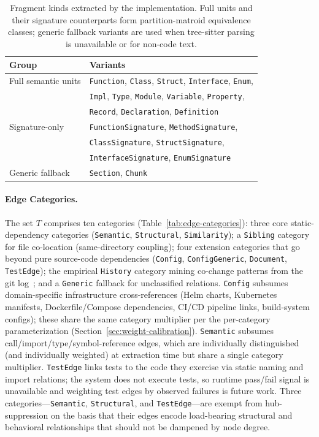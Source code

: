 \documentclass[11pt, a4paper]{article}
\begin{document}
\begin{table}[h]
\centering
\small
\begin{tabular}{ll}
\toprule
\textbf{Group} & \textbf{Variants} \\
\midrule
Full semantic units & \texttt{Function}, \texttt{Class}, \texttt{Struct}, \texttt{Interface}, \texttt{Enum}, \\
                    & \texttt{Impl}, \texttt{Type}, \texttt{Module}, \texttt{Variable}, \texttt{Property}, \\
                    & \texttt{Record}, \texttt{Declaration}, \texttt{Definition} \\
Signature-only      & \texttt{FunctionSignature}, \texttt{MethodSignature}, \\
                    & \texttt{ClassSignature}, \texttt{StructSignature}, \\
                    & \texttt{InterfaceSignature}, \texttt{EnumSignature} \\
Generic fallback    & \texttt{Section}, \texttt{Chunk} \\
\bottomrule
\end{tabular}
\caption{Fragment kinds extracted by the implementation. Full units and their signature counterparts form partition-matroid equivalence classes; generic fallback variants are used when tree-sitter parsing is unavailable or for non-code text.}
\label{tab:fragment-types}
\end{table}

\paragraph{Edge Categories.} The set $T$ comprises ten categories (Table~\ref{tab:edge-categories}): three core static-dependency categories (\texttt{Semantic}, \texttt{Structural}, \texttt{Similarity}); a \texttt{Sibling} category for file co-location (same-directory coupling); four extension categories that go beyond pure source-code dependencies (\texttt{Config}, \texttt{ConfigGeneric}, \texttt{Document}, \texttt{TestEdge}); the empirical \texttt{History} category mining co-change patterns from the git log~\cite{hassan2004predicting}; and a \texttt{Generic} fallback for unclassified relations. \texttt{Config} subsumes domain-specific infrastructure cross-references (Helm charts, Kubernetes manifests, Dockerfile/Compose dependencies, CI/CD pipeline links, build-system configs); these share the same category multiplier per the per-category parameterization (Section~\ref{sec:weight-calibration}). \texttt{Semantic} subsumes call/import/type/symbol-reference edges, which are individually distinguished (and individually weighted) at extraction time but share a single category multiplier. \texttt{TestEdge} links tests to the code they exercise via static naming and import relations; the system does not execute tests, so runtime pass/fail signal is unavailable and weighting test edges by observed failures is future work. Three categories---\texttt{Semantic}, \texttt{Structural}, and \texttt{TestEdge}---are exempt from hub-suppression on the basis that their edges encode load-bearing structural and behavioral relationships that should not be dampened by node degree.
\end{document}
